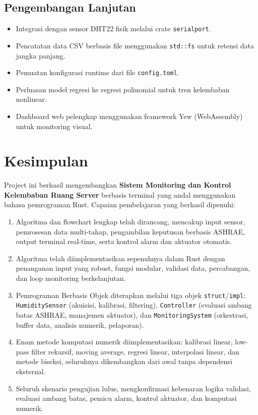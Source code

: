 \documentclass[journal]{IEEEtran}
\begin{document}
\subsection{Pengembangan Lanjutan}
\begin{itemize}
  \item Integrasi dengan sensor DHT22 fisik melalui crate \texttt{serialport}.
  \item Pencatatan data CSV berbasis file menggunakan \texttt{std::fs} untuk retensi data jangka panjang.
  \item Pemuatan konfigurasi runtime dari file \texttt{config.toml}.
  \item Perluasan model regresi ke regresi polinomial untuk tren kelembaban nonlinear.
  \item Dashboard web pelengkap menggunakan framework Yew (WebAssembly) untuk monitoring visual.
\end{itemize}

\section{Kesimpulan}
Project ini berhasil mengembangkan \textbf{Sistem Monitoring dan Kontrol Kelembaban Ruang Server} berbasis terminal yang andal menggunakan bahasa pemrograman Rust. Capaian pembelajaran yang berhasil dipenuhi:

\begin{enumerate}
  \item {Algoritma dan flowchart} lengkap telah dirancang, mencakup input sensor, pemrosesan data multi-tahap, pengambilan keputusan berbasis ASHRAE, output terminal real-time, serta kontrol alarm dan aktuator otomatis.
  \item Algoritma telah {diimplementasikan sepenuhnya dalam Rust} dengan penanganan input yang robust, fungsi modular, validasi data, percabangan, dan loop monitoring berkelanjutan.
  \item {Pemrograman Berbasis Objek} diterapkan melalui tiga objek \texttt{struct}/\texttt{impl}: \texttt{HumiditySensor} (akuisisi, kalibrasi, filtering), \texttt{Controller} (evaluasi ambang batas ASHRAE, manajemen aktuator), dan \texttt{MonitoringSystem} (orkestrasi, buffer data, analisis numerik, pelaporan).
  \item {Enam metode komputasi numerik} diimplementasikan: kalibrasi linear, low-pass filter rekursif, moving average, regresi linear, interpolasi linear, dan metode biseksi, seluruhnya dikembangkan dari awal tanpa dependensi eksternal.
  \item Seluruh skenario pengujian lulus, mengkonfirmasi kebenaran logika validasi, evaluasi ambang batas, pemicu alarm, kontrol aktuator, dan komputasi numerik.
\end{enumerate}
\end{document}
